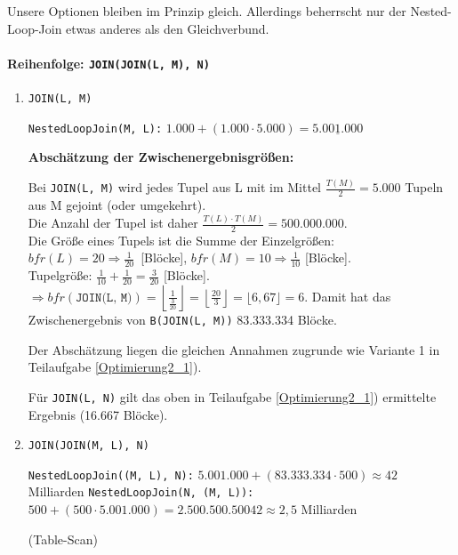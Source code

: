 \begin{enumerate}[a)]
\begin{enumerate}[i)]
		\begin{solution}
		Unsere Optionen bleiben im Prinzip gleich.
		Allerdings beherrscht nur der Nested-Loop-Join etwas anderes als den Gleichverbund.

		\paragraph{\color{solutioncolor}Reihenfolge: \texttt{JOIN(JOIN(L, M), N)}}

		\begin{enumerate}[1.]

			\item \texttt{JOIN(L, M)}

			  \texttt{NestedLoopJoin(M, L):} $1.000 + (1.000 \cdot 5.000) = \underline{5.001.000}$

			  \textbf{Abschätzung der Zwischenergebnisgrößen:}

			  Bei \texttt{JOIN(L, M)} wird jedes Tupel aus L mit im Mittel $\frac{T(M)}{2} =5.000$ Tupeln aus M gejoint (oder umgekehrt).\\
			  Die Anzahl der Tupel ist daher $\frac{T(L) \cdot T(M)}{2}=500.000.000$.\\
			  Die Größe eines Tupels ist die Summe der Einzelgrößen:\\
			  $bfr(L) = 20\Rightarrow \frac{1}{20}$~[Blöcke], $bfr(M) = 10\Rightarrow \frac{1}{10}$ [Blöcke].\\
			  Tupelgröße: $\frac{1}{10}+\frac{1}{20} = \frac{3}{20}$ [Blöcke].\\
			  $\Rightarrow bfr(\texttt{JOIN(L, M)}) = \left\lfloor\frac{1}{\frac{3}{20}}\right\rfloor = \left\lfloor \frac{20}{3}\right\rfloor =  \lfloor6,67\rfloor = 6$.
			  Damit hat das Zwischenergebnis von \texttt{B(JOIN(L, M))} 83.333.334 Blöcke.

			  Der Abschätzung liegen die gleichen Annahmen zugrunde wie Variante 1 in Teilaufgabe \ref{Optimierung2_1}).

			  Für \texttt{JOIN(L, N)} gilt das oben in Teilaufgabe \ref{Optimierung2_1}) ermittelte Ergebnis (16.667 Blöcke).

			\item \texttt{JOIN(JOIN(M, L), N)}

			  \texttt{NestedLoopJoin((M, L), N):} $5.001.000 + (83.333.334 \cdot 500) \approx 42$ Milliarden
			  \texttt{NestedLoopJoin(N, (M, L)):} $500 + (500 \cdot 5.001.000) = 2.500.500.500 42 \approx 2,5$ Milliarden

			\begin{note}
			(Table-Scan)


\end{note}
\end{enumerate}
\end{solution}
\end{enumerate}
\end{enumerate}
